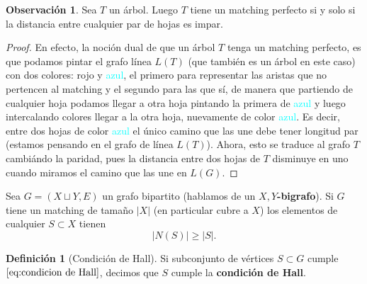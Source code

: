\documentclass[12pt]{report}
\theoremstyle{plain}
\theoremstyle{definition}
\newtheorem{definition}[theorem]{Definición}
\newtheorem{obs}[theorem]{Observación}
\newcommand{\red}[1]{\textcolor{BrickRed}{#1}}
\newcommand{\blue}[1]{\textcolor{Cyan}{#1}}
\newcommand{\abs}[1]{\left \vert #1 \right \vert}
\begin{document}
\begin{obs}
Sea $T$ un árbol. Luego $T$ tiene un matching perfecto si y solo si la distancia entre cualquier par de hojas es impar.
\end{obs}
\begin{proof}
En efecto, la noción dual de que un árbol $T$ tenga un matching perfecto, es que podamos pintar el grafo
línea $L(T)$ (que
también es un árbol en este caso) con dos colores: \red{rojo} y \blue{azul}, el primero para representar las aristas
que no
pertencen al matching y el segundo para las que sí, de manera que partiendo de cualquier hoja podamos llegar a
otra hoja pintando la primera de \blue{azul} y luego intercalando colores llegar a la otra hoja, nuevamente de color
\blue{azul}.
Es decir, entre dos hojas de color \blue{azul} el único camino que las une debe tener longitud par (estamos pensando
en el grafo de línea $L(T)$).
Ahora, esto se traduce al grafo $T$ cambiándo la paridad, pues la distancia entre dos hojas de $T$ disminuye en uno
cuando miramos el camino que las une en $L(G)$.

\end{proof}


Sea $G = (X \sqcup Y, E)$ un grafo bipartito (hablamos de un \textbf{$X,Y$-bigrafo}). Si $G$ tiene un matching de
tamaño $\abs X$  (en particular cubre a $X$) los elementos de cualquier $S \subset X$ tienen
\begin{equation}\label{eq:condicion de Hall}
\abs{N(S)} \geq \abs S.
\end{equation}

\begin{definition}[Condición de Hall]
    Si subconjunto de vértices $S \subset G$ cumple $\eqref{eq:condicion de Hall}$, decimos que $
    S$ cumple la \textbf{condición de Hall}.
\end{definition}
\end{document}
